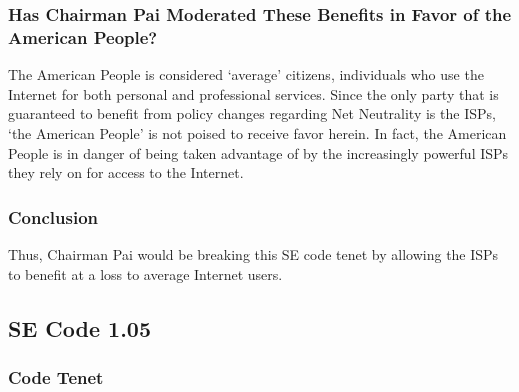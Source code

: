 \documentclass[12pt]{article}
\begin{document}
\begin{multicols}{2}
\begin{center}
{}
\end{center}

\subsubsection{Has Chairman Pai Moderated These Benefits in Favor of the American People?}
The American People is considered `average' citizens, individuals who use the Internet for both personal and professional services. Since the only party that is guaranteed to benefit from policy changes regarding Net Neutrality is the ISPs, `the American People' is not poised to receive favor herein. In fact, the American People is in danger of being taken advantage of by the increasingly powerful ISPs they rely on for access to the Internet.\cite{eff-pro-net}

\subsubsection{Conclusion}
Thus, Chairman Pai would be breaking this SE code tenet by allowing the ISPs to benefit at a loss to average Internet users.


\subsection{SE Code 1.05}
  \subsubsection{Code Tenet}
  

\end{multicols}
\end{document}

